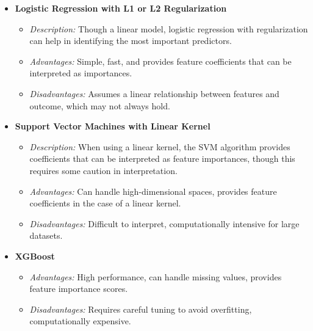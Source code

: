 \begin{itemize}
            \item \textbf{Logistic Regression with L1 or L2 Regularization}
            \begin{itemize}
                \item \textit{Description:} Though a linear model, logistic regression with regularization can help in identifying the most important predictors.
                \item \textit{Advantages:} Simple, fast, and provides feature coefficients that can be interpreted as importances.
                \item \textit{Disadvantages:} Assumes a linear relationship between features and outcome, which may not always hold.
            \end{itemize}

            \item \textbf{Support Vector Machines with Linear Kernel}
            \begin{itemize}
                \item \textit{Description:} When using a linear kernel, the SVM algorithm provides coefficients that can be interpreted as feature importances, though this requires some caution in interpretation.
                \item \textit{Advantages:} Can handle high-dimensional spaces, provides feature coefficients in the case of a linear kernel.
                \item \textit{Disadvantages:} Difficult to interpret, computationally intensive for large datasets.
            \end{itemize}

            \item \textbf{XGBoost}
            \begin{itemize}
                \item \textit{Advantages:} High performance, can handle missing values, provides feature importance scores.
                \item \textit{Disadvantages:} Requires careful tuning to avoid overfitting, computationally expensive.
            \end{itemize}

        \end{itemize}

